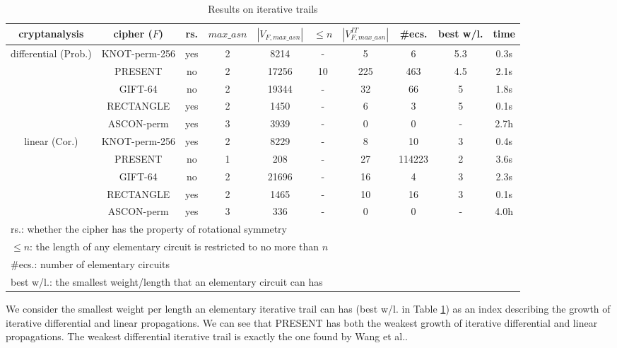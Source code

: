 \begin{table}
	\caption{Results on iterative trails}\label{tab:iterative-trails}
	\centering
	\tiny
	\begin{tabular}{|c|c|c|c|c|c|c|c|c|c|}
		\hline
		cryptanalysis & cipher ($F$) & rs. & $max\_asn$ &$|V_{F,max\_asn}|$&$\leq n$& $|V^{IT}_{F,max\_asn}|$ & \#ecs. & best w/l. &time\\
		\hline
		\multirow{5}{*}{differential (Prob.)}
		&KNOT-perm-256 & yes & 2 & 8214 & - & 5 & 6 & 5.3 & 0.3s\\
		\cline{2-10}
		&PRESENT & no & 2 & 17256 & 10 & 225 & 463 & 4.5 & 2.1s\\
		\cline{2-10}
		&GIFT-64 & no & 2 & 19344 & - & 32 & 66 & 5 & 1.8s\\
		\cline{2-10}
		& RECTANGLE & yes & 2 & 1450 & - & 6 & 3 & 5 & 0.1s\\
		\cline{2-10}
		& ASCON-perm & yes & 3 & 3939 & - & 0 & 0 & - & 2.7h\\
		\hline
		\multirow{4}{*}{linear (Cor.)}
		& KNOT-perm-256 & yes & 2 & 8229 & - & 8 & 10 & 3 & 0.4s\\
		\cline{2-10}
		& PRESENT & no & 1 & 208 & - & 27 & 114223 & 2 & 3.6s\\
		\cline{2-10}
		& GIFT-64 & no & 2 & 21696 & - & 16 & 4 & 3 & 2.3s\\
		\cline{2-10}
		& RECTANGLE & yes & 2 & 1465 & - & 10 & 16 & 3 & 0.1s\\
		\cline{2-10}
		& ASCON-perm & yes & 3 & 336 & - & 0 & 0 & - & 4.0h\\
		\hline
		\multicolumn{9}{l}{rs.: whether the cipher has the property of rotational symmetry}\\
		\multicolumn{9}{l}{$\leq n$: the length of any elementary circuit is restricted to no more than $n$}\\
		\multicolumn{9}{l}{\#ecs.: number of elementary circuits}\\
		\multicolumn{9}{l}{best w/l.: the smallest weight/length that an elementary circuit can has}\\
	\end{tabular}
\end{table}

We consider the smallest weight per length an elementary iterative trail can has (best w/l. in Table \ref{tab:iterative-trails}) as an index describing the growth of iterative differential and linear propagations. We can see that PRESENT has both the weakest growth of iterative differential and linear propagations. The weakest differential iterative trail is exactly the one found by Wang et al.\cite{W08}. 

